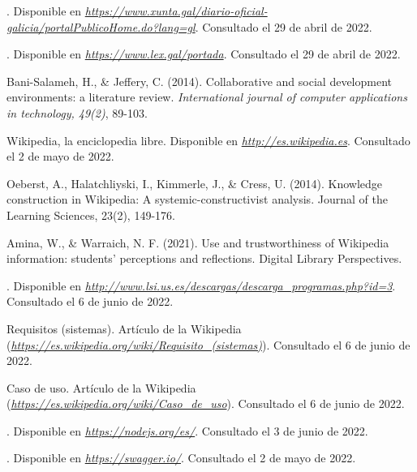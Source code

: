 

\begin{thebibliography}{99}

. Disponible en {\it \url{https://www.xunta.gal/diario-oficial-galicia/portalPublicoHome.do?lang=gl}}. Consultado el 29 de abril de 2022.

. Disponible en {\it \url{https://www.lex.gal/portada}}. Consultado el 29 de abril de 2022.

 Bani-Salameh, H., \& Jeffery, C. (2014). Collaborative and social development environments: a literature review. {\it International journal of computer applications in technology, 49(2)}, 89-103.

 Wikipedia, la enciclopedia libre. Disponible en {\it \url{http://es.wikipedia.es}}. Consultado el 2 de mayo de 2022.

 Oeberst, A., Halatchliyski, I., Kimmerle, J., \& Cress, U. (2014). Knowledge construction in Wikipedia: A systemic-constructivist analysis. Journal of the Learning Sciences, 23(2), 149-176.

 Amina, W., \& Warraich, N. F. (2021). Use and trustworthiness of Wikipedia information: students’ perceptions and reflections. Digital Library Perspectives.

. Disponible en {\it \url{http://www.lsi.us.es/descargas/descarga_programas.php?id=3}}. Consultado el 6 de junio de 2022.

 Requisitos (sistemas). Artículo de la Wikipedia ({\it \url{https://es.wikipedia.org/wiki/Requisito_(sistemas)}}). Consultado el 6 de junio de 2022.

 Caso de uso. Artículo de la Wikipedia ({\it \url{https://es.wikipedia.org/wiki/Caso_de_uso}}). Consultado el 6 de junio de 2022.

. Disponible en {\it \url{https://nodejs.org/es/}}. Consultado el 3 de junio de 2022.

. Disponible en {\it \url{https://swagger.io/}}. Consultado el 2 de mayo de 2022.


\end{thebibliography}
